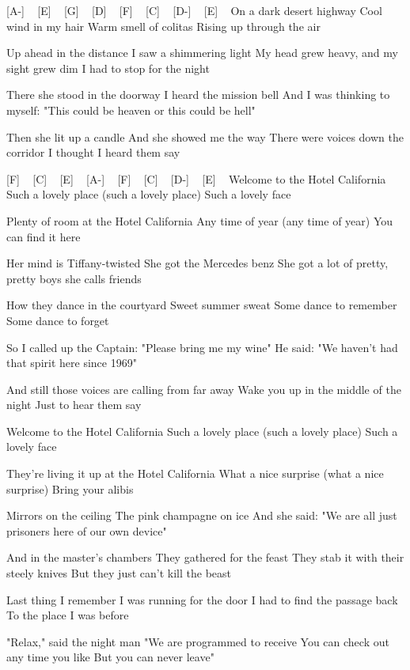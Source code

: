 [A-] ~ [E] ~ [G] ~ [D] ~ [F] ~ [C] ~ [D-] ~ [E] ~
On a dark desert highway
Cool wind in my hair
Warm smell of colitas
Rising up through the air

Up ahead in the distance
I saw a shimmering light
My head grew heavy, and my sight grew dim
I had to stop for the night

There she stood in the doorway
I heard the mission bell
And I was thinking to myself:
"This could be heaven or this could be hell"

Then she lit up a candle
And she showed me the way
There were voices down the corridor
I thought I heard them say


[F] ~ [C] ~ [E] ~ [A-] ~ [F] ~ [C] ~ [D-] ~ [E] ~
Welcome to the Hotel California
Such a lovely place (such a lovely place)
Such a lovely face

Plenty of room at the Hotel California
Any time of year (any time of year)
You can find it here

Her mind is Tiffany-twisted
She got the Mercedes benz
She got a lot of pretty, pretty boys she calls friends

How they dance in the courtyard
Sweet summer sweat
Some dance to remember
Some dance to forget

So I called up the Captain:
"Please bring me my wine"
He said: "We haven't had that spirit here since 1969"

And still those voices are calling from far away
Wake you up in the middle of the night
Just to hear them say

Welcome to the Hotel California
Such a lovely place (such a lovely place)
Such a lovely face

They're living it up at the Hotel California
What a nice surprise (what a nice surprise)
Bring your alibis

Mirrors on the ceiling
The pink champagne on ice
And she said: "We are all just prisoners here of our own
device"

And in the master's chambers
They gathered for the feast
They stab it with their steely knives
But they just can't kill the beast

Last thing I remember
I was running for the door
I had to find the passage back
To the place I was before

"Relax," said the night man
"We are programmed to receive
You can check out any time you like
But you can never leave"
